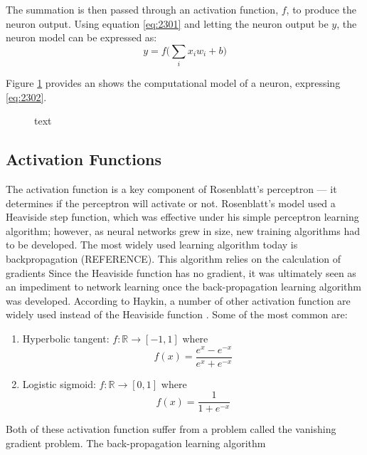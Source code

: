 The summation is then passed through an activation function, $f$, to produce the neuron output. Using equation \ref{eq:2301} and letting the neuron output be $y$, the neuron model can be expressed as:
\begin{equation}
	y = f\bigg( \sum_{i}x_i w_i + b \bigg) \label{eq:2302}
\end{equation}

Figure \ref{fig:2301_perceptron_model} provides an shows the computational model of a neuron, expressing \ref{eq:2302}.

\begin{figure}[h]
	\centering
	
	\caption{text}
	\label{fig:2301_perceptron_model}
\end{figure}



\subsection{Activation Functions}
The activation function is a key component of Rosenblatt's perceptron --- it determines if the perceptron will activate or not. Rosenblatt's model used a Heaviside step function, which was effective under his simple perceptron learning algorithm; however, as neural networks grew in size, new training algorithms had to be developed. The most widely used learning algorithm today is backpropagation (REFERENCE). This algorithm relies on the calculation of gradients Since the Heaviside function has no gradient, it was ultimately seen as an impediment to network learning once the back-propagation learning algorithm was developed. According to Haykin, a number of other activation function are widely used instead of the Heaviside function \cite{Haykin99}. Some of the most common are:
\begin{enumerate}
	\item Hyperbolic tangent: $f:\mathbb{R} \to [-1,1]$ where
	\begin{equation}
		f(x) = \frac{e^x - e^{-x}}{e^x + e^{-x}}
	\end{equation}
	\item Logistic sigmoid: $f:\mathbb{R} \to [0,1]$ where
	\begin{equation}
		f(x) = \frac{1}{1 + e^{-x}}
	\end{equation}
\end{enumerate}

Both of these activation function suffer from a problem called the vanishing gradient problem. The back-propagation learning algorithm  




